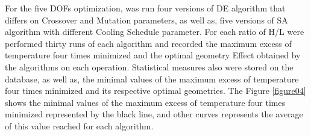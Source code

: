 \documentclass[10pt,fleqn,a4paper,twoside]{article}
\begin{document}
For the five DOFs optimization, was run four versions of DE algorithm that differs on Crossover and Mutation parameters, as well as, five versions of SA algorithm with different Cooling Schedule parameter. For each ratio of H/L were performed thirty runs of each algorithm and recorded the maximum excess of temperature four times minimized and the optimal geometry Effect obtained by the algorithms on each operation. Statistical measures also were stored on the database, as well as, the minimal values of the maximum excess of temperature four times minimized and its respective optimal geometries. The Figure \ref{figure04} shows  the minimal values of the maximum excess of temperature four times minimized represented by the black line, and other curves represents the average of this value reached for each algorithm. 

\end{document}
